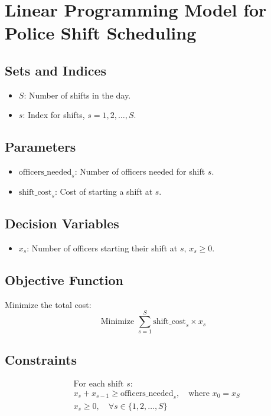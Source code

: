 \documentclass{article}
\begin{document}
\section*{Linear Programming Model for Police Shift Scheduling}

\subsection*{Sets and Indices}
\begin{itemize}
    \item \( S \): Number of shifts in the day.
    \item \( s \): Index for shifts, \( s = 1, 2, \ldots, S \).
\end{itemize}

\subsection*{Parameters}
\begin{itemize}
    \item \(\text{officers\_needed}_s\): Number of officers needed for shift \( s \).
    \item \(\text{shift\_cost}_s\): Cost of starting a shift at \( s \).
\end{itemize}

\subsection*{Decision Variables}
\begin{itemize}
    \item \( x_s \): Number of officers starting their shift at \( s \), \( x_s \geq 0 \).
\end{itemize}

\subsection*{Objective Function}
Minimize the total cost:
\[
\text{Minimize } \sum_{s=1}^{S} \text{shift\_cost}_s \times x_s
\]

\subsection*{Constraints}
\begin{align*}
    & \text{For each shift } s: \\
    & x_{s} + x_{s-1} \geq \text{officers\_needed}_s, \quad \text{where } x_{0} = x_{S} \\
    & x_s \geq 0, \quad \forall s \in \{1, 2, \ldots, S\}
\end{align*}
\end{document}
